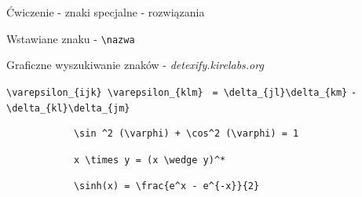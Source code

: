 \documentclass{beamer}
\theoremstyle{newblock}
\begin{document}
\begin{frame}[fragile]{Ćwiczenie  - znaki specjalne - rozwiązania}

    
    Wstawiane znaku - \verb|\nazwa|

    Graficzne wyszukiwanie znaków - \textit{detexify.kirelabs.org}

    \begin{examples}
        \verb|\varepsilon_{ijk} \varepsilon_{klm}| \verb| = \delta_{jl}\delta_{km}| \verb|- \delta_{kl}\delta_{jm}|
    \end{examples}

    \begin{examples}
        \begin{verbatim}
            \sin ^2 (\varphi) + \cos^2 (\varphi) = 1
        \end{verbatim}
    \end{examples}

    \begin{examples}
        \begin{verbatim}
            x \times y = (x \wedge y)^*
        \end{verbatim}
    \end{examples}

    \begin{examples}

        \begin{verbatim}
            \sinh(x) = \frac{e^x - e^{-x}}{2}
        \end{verbatim}
    \end{examples}
\end{frame}
\end{document}
